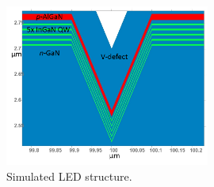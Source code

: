 \begin{figure}[h]
	\centering
	\includegraphics[width=0.6\textwidth]{Figs/Ch3/Sim}
	\caption[h] {Simulated LED structure.}
	\label{simsetup}
\end{figure}
\FloatBarrier 

